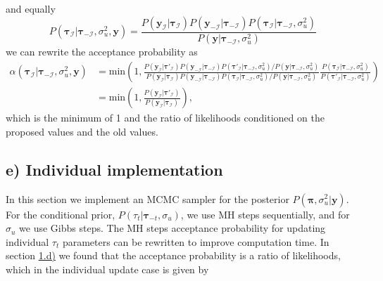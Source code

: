 \documentclass[
]{article}
\begin{document}
and equally
\[
  P( \boldsymbol{\tau}_ \mathcal{I}| \boldsymbol{\tau}_ {-\mathcal{I}}, \sigma_u^2, \boldsymbol{y}) 
  = 
  \frac{P(\boldsymbol{y}_\mathcal{I}| \boldsymbol{\tau}_ \mathcal{I})P(\boldsymbol{y}_\mathcal{-I}| \boldsymbol{\tau}_ \mathcal{-I}) P(\boldsymbol{\tau}_ \mathcal{I}| \boldsymbol{\tau}_ {-\mathcal{I}}, \sigma_u^2)}{P(\boldsymbol{y}| \boldsymbol{\tau}_ {-\mathcal{I}}, \sigma_u^2)}
\]
we can rewrite the acceptance probability as
\[
\begin{aligned}
  \alpha(\boldsymbol{\tau}_ \mathcal{I}| \boldsymbol{\tau}_ {-\mathcal{I}}, \sigma_u^2, \boldsymbol{y}) &= \text{min} \left( 1, \frac{{P(\boldsymbol{y}_\mathcal{I}| \boldsymbol{\tau}'_ \mathcal{I})P(\boldsymbol{y}_\mathcal{-I}| \boldsymbol{\tau}_ \mathcal{-I}) P(\boldsymbol{\tau}'_ \mathcal{I}| \boldsymbol{\tau}_ {-\mathcal{I}}, \sigma_u^2)}/{P(\boldsymbol{y}| \boldsymbol{\tau}_ {-\mathcal{I}}, \sigma_u^2)}}
  {{P(\boldsymbol{y}_\mathcal{I}| \boldsymbol{\tau}_ \mathcal{I})P(\boldsymbol{y}_\mathcal{-I}| \boldsymbol{\tau}_ \mathcal{-I}) P(\boldsymbol{\tau}_ \mathcal{I}| \boldsymbol{\tau}_ {-\mathcal{I}}, \sigma_u^2)}/{P(\boldsymbol{y}| \boldsymbol{\tau}_ {-\mathcal{I}}, \sigma_u^2)}}
  \frac{P(\boldsymbol{\tau}_\mathcal{I}|\boldsymbol{\tau}_{-\mathcal{I}}, \sigma_u^2)}{P(\boldsymbol{\tau}'_\mathcal{I}|\boldsymbol{\tau}_{-\mathcal{I}}, \sigma_u^2)} 
  \right)
  \\
  &= \text{min} \left( 1, \frac{P(\boldsymbol{y}_\mathcal{I}| \boldsymbol{\tau}'_ \mathcal{I})}{P(\boldsymbol{y}_\mathcal{I}| \boldsymbol{\tau}_ \mathcal{I})} 
  \right),
\end{aligned}
\]
which is the minimum of 1 and the ratio of likelihoods conditioned on the proposed values and the old values.

\hypertarget{sec:1e}{%
\subsection{e) Individual implementation}\label{sec:1e}}

In this section we implement an MCMC sampler for the posterior \(P(\boldsymbol{\pi}, \sigma_u^2| \boldsymbol{y})\). For the conditional prior, \(P(\tau_t | \boldsymbol{\tau}_{-t}, \sigma_u)\), we use MH steps sequentially, and for \(\sigma_u\) we use Gibbs steps. The MH steps acceptance probability for updating individual \(\tau_t\) parameters can be rewritten to improve computation time. In section \protect\hyperlink{sec:1d}{1.d)} we found that the acceptance probability is a ratio of likelihoods, which in the individual update case is given by
\end{document}
